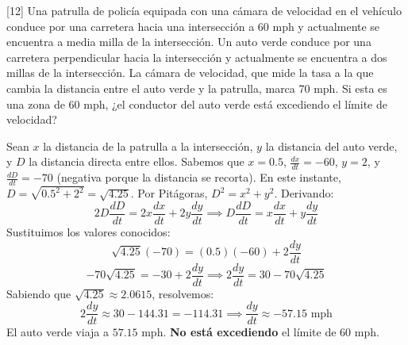 \documentclass[11pt,paper=a4,answers, addpoints]{exam}
\begin{document}
\begin{questions}

[12\half]
Una patrulla de policía equipada con una cámara de velocidad en el vehículo conduce por una carretera hacia una intersección a 60 mph y actualmente se encuentra a media milla de la intersección. Un auto verde conduce por una carretera perpendicular hacia la intersección y actualmente se encuentra a dos millas de la intersección. La cámara de velocidad, que mide la tasa a la que cambia la distancia entre el auto verde y la patrulla, marca 70 mph. Si esta es una zona de 60 mph, ¿el conductor del auto verde está excediendo el límite de velocidad?
\begin{solution}
Sean $x$ la distancia de la patrulla a la intersección, $y$ la distancia del auto verde, y $D$ la distancia directa entre ellos.
Sabemos que $x = 0.5$, $\frac{dx}{dt} = -60$, $y = 2$, y $\frac{dD}{dt} = -70$ (negativa porque la distancia se recorta).
En este instante, $D = \sqrt{0.5^2 + 2^2} = \sqrt{4.25}$.
Por Pitágoras, $D^2 = x^2 + y^2$. Derivando:
\[ 2D \frac{dD}{dt} = 2x \frac{dx}{dt} + 2y \frac{dy}{dt} \implies D \frac{dD}{dt} = x \frac{dx}{dt} + y \frac{dy}{dt} \]
Sustituimos los valores conocidos:
\[ \sqrt{4.25}(-70) = (0.5)(-60) + 2\frac{dy}{dt} \]
\[ -70\sqrt{4.25} = -30 + 2\frac{dy}{dt} \implies 2\frac{dy}{dt} = 30 - 70\sqrt{4.25} \]
Sabiendo que $\sqrt{4.25} \approx 2.0615$, resolvemos:
\[ 2\frac{dy}{dt} \approx 30 - 144.31 = -114.31 \implies \frac{dy}{dt} \approx -57.15 \text{ mph} \]
El auto verde viaja a $57.15 \text{ mph}$. \textbf{No está excediendo} el límite de 60 mph.
\end{solution}


\end{questions}
\end{document}
